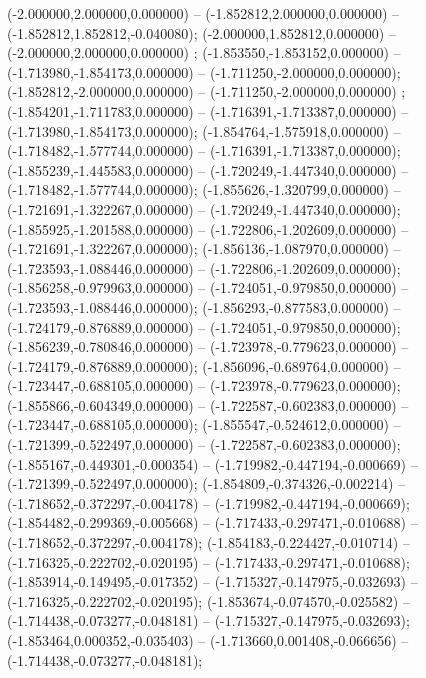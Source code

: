  (-2.000000,2.000000,0.000000) -- (-1.852812,2.000000,0.000000) -- (-1.852812,1.852812,-0.040080);
 (-2.000000,1.852812,0.000000) -- (-2.000000,2.000000,0.000000) ;
 (-1.853550,-1.853152,0.000000) -- (-1.713980,-1.854173,0.000000) -- (-1.711250,-2.000000,0.000000);
 (-1.852812,-2.000000,0.000000) -- (-1.711250,-2.000000,0.000000) ;
 (-1.854201,-1.711783,0.000000) -- (-1.716391,-1.713387,0.000000) -- (-1.713980,-1.854173,0.000000);
 (-1.854764,-1.575918,0.000000) -- (-1.718482,-1.577744,0.000000) -- (-1.716391,-1.713387,0.000000);
 (-1.855239,-1.445583,0.000000) -- (-1.720249,-1.447340,0.000000) -- (-1.718482,-1.577744,0.000000);
 (-1.855626,-1.320799,0.000000) -- (-1.721691,-1.322267,0.000000) -- (-1.720249,-1.447340,0.000000);
 (-1.855925,-1.201588,0.000000) -- (-1.722806,-1.202609,0.000000) -- (-1.721691,-1.322267,0.000000);
 (-1.856136,-1.087970,0.000000) -- (-1.723593,-1.088446,0.000000) -- (-1.722806,-1.202609,0.000000);
 (-1.856258,-0.979963,0.000000) -- (-1.724051,-0.979850,0.000000) -- (-1.723593,-1.088446,0.000000);
 (-1.856293,-0.877583,0.000000) -- (-1.724179,-0.876889,0.000000) -- (-1.724051,-0.979850,0.000000);
 (-1.856239,-0.780846,0.000000) -- (-1.723978,-0.779623,0.000000) -- (-1.724179,-0.876889,0.000000);
 (-1.856096,-0.689764,0.000000) -- (-1.723447,-0.688105,0.000000) -- (-1.723978,-0.779623,0.000000);
 (-1.855866,-0.604349,0.000000) -- (-1.722587,-0.602383,0.000000) -- (-1.723447,-0.688105,0.000000);
 (-1.855547,-0.524612,0.000000) -- (-1.721399,-0.522497,0.000000) -- (-1.722587,-0.602383,0.000000);
 (-1.855167,-0.449301,-0.000354) -- (-1.719982,-0.447194,-0.000669) -- (-1.721399,-0.522497,0.000000);
 (-1.854809,-0.374326,-0.002214) -- (-1.718652,-0.372297,-0.004178) -- (-1.719982,-0.447194,-0.000669);
 (-1.854482,-0.299369,-0.005668) -- (-1.717433,-0.297471,-0.010688) -- (-1.718652,-0.372297,-0.004178);
 (-1.854183,-0.224427,-0.010714) -- (-1.716325,-0.222702,-0.020195) -- (-1.717433,-0.297471,-0.010688);
 (-1.853914,-0.149495,-0.017352) -- (-1.715327,-0.147975,-0.032693) -- (-1.716325,-0.222702,-0.020195);
 (-1.853674,-0.074570,-0.025582) -- (-1.714438,-0.073277,-0.048181) -- (-1.715327,-0.147975,-0.032693);
 (-1.853464,0.000352,-0.035403) -- (-1.713660,0.001408,-0.066656) -- (-1.714438,-0.073277,-0.048181);
